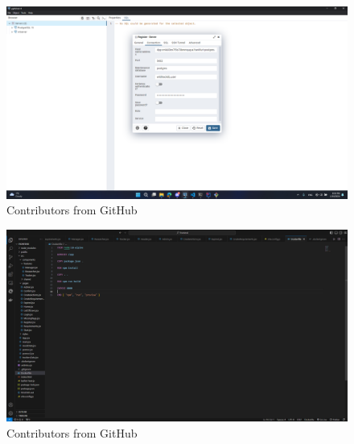 	\begin{figure}[H]
		\includegraphics[scale=0.32]{slike/b.png} %
		\centering
		\caption{Contributors from GitHub}
		\label{fig:contributors} %
	\end{figure}
	\begin{figure}[H]
		\includegraphics[scale=0.32]{slike/dockerfile.png} %
		\centering
		\caption{Contributors from GitHub}
		\label{fig:contributors} %
	\end{figure}




\eject 